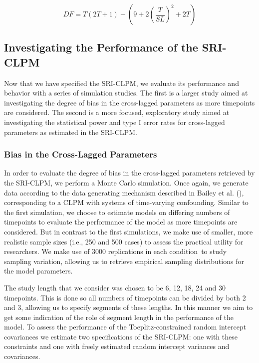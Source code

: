 \documentclass[
  man,
  floatsintext,
  longtable,
  nolmodern,
  notxfonts,
  notimes,
  colorlinks=true,linkcolor=blue,citecolor=blue,urlcolor=blue]{apa7}
\begin{document}
\[
DF = T(2T+1)-(9+2(\frac{T}{SL})^2+2T)
\]

\subsection{Investigating the Performance of the
SRI-CLPM}\label{investigating-the-performance-of-the-sri-clpm}

Now that we have specified the SRI-CLPM, we evaluate its performance and
behavior with a series of simulation studies. The first is a larger
study aimed at investigating the degree of bias in the cross-lagged
parameters as more timepoints are considered. The second is a more
focused, exploratory study aimed at investigating the statistical power
and type I error rates for cross-lagged parameters as estimated in the
SRI-CLPM.

\subsubsection{Bias in the Cross-Lagged
Parameters}\label{bias-in-the-cross-lagged-parameters}

In order to evaluate the degree of bias in the cross-lagged parameters
retrieved by the SRI-CLPM, we perform a Monte Carlo simulation. Once
again, we generate data according to the data generating mechanism
described in Bailey et al.
(), corresponding to a
CLPM with systems of time-varying confounding. Similar to the first
simulation, we choose to estimate models on differing numbers of
timepoints to evaluate the performance of the model as more timepoints
are considered. But in contrast to the first simulations, we make use of
smaller, more realistic sample sizes (i.e., 250 and 500 cases) to assess
the practical utility for researchers. We make use of 3000 replications
in each condition~to study sampling variation, allowing us to retrieve
empirical sampling distributions for the model parameters.

The study length that we consider was chosen to be 6, 12, 18, 24 and 30
timepoints. This is done so all numbers of timepoints can be divided by
both 2 and 3, allowing us to specify segments of these lengths. In this
manner we aim to get some indication of the role of segment length in
the performance of the model. To assess the performance of the
Toeplitz-constrained random intercept covariances we estimate two
specifications of the SRI-CLPM: one with these constraints and one with
freely estimated random intercept variances and covariances.
\end{document}
